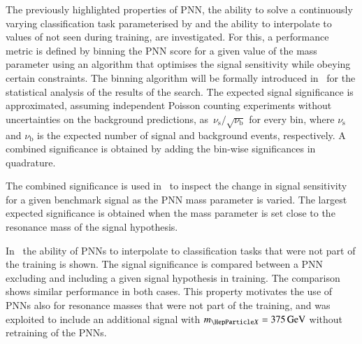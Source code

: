 The previously highlighted properties of PNN, the ability to solve a
continuously varying classification task parameterised by \mX and the
ability to interpolate to values of \mX not seen during training, are
investigated. For this, a performance metric is defined by binning the
PNN score for a given value of the mass parameter using an algorithm
that optimises the signal sensitivity while obeying certain
constraints. The binning algorithm will be formally introduced
in~ for the statistical analysis of the results
of the search.
The expected signal significance is approximated, assuming independent
Poisson counting experiments without uncertainties on the background
predictions, as~$\nu_\text{s} / \sqrt{\nu_\text{b}}$ for every bin,
where $\nu_\text{s}$ and $\nu_\text{b}$ is the expected number of
signal and background events, respectively. A combined significance is
obtained by adding the bin-wise significances in quadrature.

The combined significance is used in~ to
inspect the change in signal sensitivity for a given benchmark signal
as the PNN mass parameter is varied. The largest expected significance
is obtained when the mass parameter is set close to the resonance mass
of the signal hypothesis.

In~ the ability of PNNs to interpolate to
classification tasks that were not part of the training is shown. The
signal significance is compared between a PNN excluding and including
a given signal hypothesis in training. The comparison shows similar
performance in both cases. This property motivates the use of PNNs
also for resonance masses that were not part of the training, and was
exploited to include an additional signal with $\mX = \SI{375}{\GeV}$
without retraining of the PNNs. %

